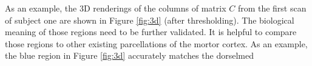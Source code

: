 \documentclass[fleqn]{article}
\let\oldref\ref
\renewcommand{\ref}[1]{(\oldref{#1})}
\begin{document}
As an example, the 3D renderings of the columns of matrix $C$ from the first scan of subject one are shown in Figure \oldref{fig:3d} (after thresholding). The biological meaning of those regions need to be further validated. It is helpful to compare those regions to other existing parcellations of the mortor cortex. As an example, the blue region in Figure \oldref{fig:3d} accurately matches the dorselmed
\end{document}
